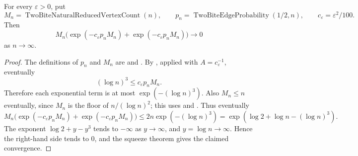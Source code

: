 \begin{lemma}
For every \(\varepsilon>0\), put
\[
M_n=\operatorname{TwoBiteNaturalReducedVertexCount}(n),\qquad
p_n=\operatorname{TwoBiteEdgeProbability}(1/2,n),\qquad
c_\varepsilon=\varepsilon^2/100 .
\]
Then
\[
M_n\bigl(\exp(-c_\varepsilon p_nM_n)+
          \exp(-c_\varepsilon p_nM_n)\bigr)\to 0
\]
as \(n\to\infty\).
\end{lemma}
\begin{proof}
The definitions of \(p_n\) and \(M_n\) are
 and
.  By
, applied with
\(A=c_\varepsilon^{-1}\), eventually
\[
(\log n)^3\leq c_\varepsilon p_nM_n .
\]
Therefore each exponential term is at most \(\exp(-(\log n)^3)\).  Also
\(M_n\leq n\) eventually, since \(M_n\) is the floor of \(n/(\log n)^2\);
this uses  and .
Thus eventually
\[
M_n\bigl(\exp(-c_\varepsilon p_nM_n)+
          \exp(-c_\varepsilon p_nM_n)\bigr)
 \leq
2n\exp(-(\log n)^3)
=
\exp(\log 2+\log n-(\log n)^3).
\]
The exponent \(\log 2+y-y^3\) tends to \(-\infty\) as \(y\to\infty\), and
\(y=\log n\to\infty\).  Hence the right-hand side tends to \(0\), and the
squeeze theorem gives the claimed convergence.
\end{proof}
